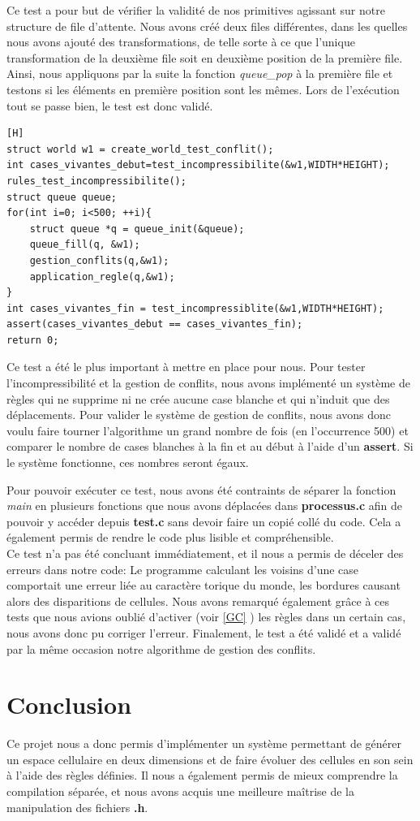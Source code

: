 \documentclass[11pt, a4paper]{article}
\begin{document}
Ce test a pour but de vérifier la validité de nos primitives agissant sur notre structure de file d'attente. Nous avons créé deux files différentes, dans les quelles nous avons ajouté des transformations, de telle sorte à ce que l'unique transformation de la deuxième file soit en deuxième position de la première file. Ainsi, nous appliquons par la suite la fonction \textit{queue\_pop} à la première file et testons si les éléments en première position sont les mêmes. Lors de l'exécution tout se passe bien, le test est donc validé.

\begin{lstlisting}[frame = single][H]
struct world w1 = create_world_test_conflit();
int cases_vivantes_debut=test_incompressibilite(&w1,WIDTH*HEIGHT);
rules_test_incompressibilite();
struct queue queue;
for(int i=0; i<500; ++i){
    struct queue *q = queue_init(&queue);
    queue_fill(q, &w1);
    gestion_conflits(q,&w1);
    application_regle(q,&w1);
}
int cases_vivantes_fin = test_incompressiblite(&w1,WIDTH*HEIGHT);
assert(cases_vivantes_debut == cases_vivantes_fin);
return 0;
\end{lstlisting}

Ce test a été le plus important à mettre en place pour nous. Pour tester l'incompressibilité et la gestion de conflits, nous avons implémenté un système de règles qui ne supprime ni ne crée aucune case blanche et qui n'induit que des déplacements. Pour valider le système de gestion de conflits, nous avons donc voulu faire tourner l'algorithme un grand nombre de fois (en l'occurrence 500)  et comparer le nombre de cases blanches à la fin et au début à l'aide d'un \textbf{assert}. Si le système fonctionne, ces nombres seront égaux.


Pour pouvoir exécuter ce test, nous avons été contraints de séparer la fonction \textit{main} en plusieurs fonctions que nous avons déplacées dans \textbf{processus.c} afin de pouvoir y accéder depuis \textbf{test.c} sans devoir faire un copié collé du code. Cela a également permis de rendre le code plus lisible et compréhensible.\\

Ce test n'a pas été concluant immédiatement, et il nous a permis de déceler des erreurs dans notre code: Le programme calculant les voisins d'une case comportait une erreur liée au caractère torique du monde, les bordures causant alors des disparitions de cellules. Nous avons remarqué également grâce à ces tests que nous avions oublié d'activer (voir \ref{GC} ) les règles dans un certain cas, nous avons donc pu corriger l'erreur. Finalement, le test a été validé et a validé par la même occasion notre algorithme de gestion des conflits.
\section{Conclusion}

Ce projet nous a donc permis d'implémenter un système permettant de générer un espace cellulaire en deux dimensions et de faire évoluer des cellules en son sein à l'aide des règles définies. Il nous a également permis de mieux comprendre la compilation séparée, et nous avons acquis une meilleure maîtrise de la manipulation des fichiers \textbf{.h}. 
\end{document}
